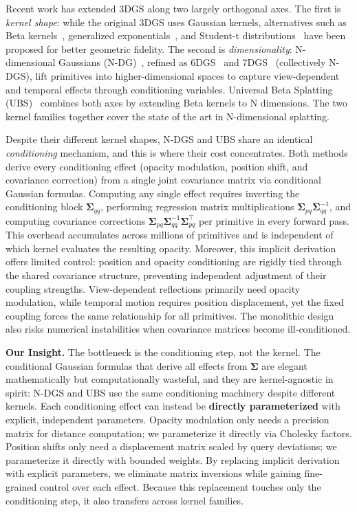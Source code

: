 \documentclass{article}
\theoremstyle{plain}
\theoremstyle{definition}
\theoremstyle{remark}
\begin{document}
Recent work has extended 3DGS along two largely orthogonal axes. The first is \textit{kernel shape}: while the original 3DGS uses Gaussian kernels, alternatives such as Beta kernels~\citep{liu2025deformable,liu2025universal}, generalized exponentials~\citep{hamdi2024gesgeneralizedexponentialsplatting}, and Student-t distributions~\citep{zhu20253dstudentsplattingscooping} have been proposed for better geometric fidelity. The second is \textit{dimensionality}: N-dimensional Gaussians (N-DG)~\citep{diolatzis2024n}, refined as 6DGS~\citep{gao20246dgs} and 7DGS~\citep{gao20257dgs} (collectively N-DGS), lift primitives into higher-dimensional spaces to capture view-dependent and temporal effects through conditioning variables. Universal Beta Splatting (UBS)~\citep{liu2025universal} combines both axes by extending Beta kernels to N dimensions. The two kernel families together cover the state of the art in N-dimensional splatting.

Despite their different kernel shapes, N-DGS and UBS share an identical \textit{conditioning} mechanism, and this is where their cost concentrates. Both methods derive every conditioning effect (opacity modulation, position shift, and covariance correction) from a single joint covariance matrix via conditional Gaussian formulas. Computing any single effect requires inverting the conditioning block $\boldsymbol{\Sigma}_{qq}$, performing regression matrix multiplications $\boldsymbol{\Sigma}_{pq}\boldsymbol{\Sigma}_{qq}^{-1}$, and computing covariance corrections $\boldsymbol{\Sigma}_{pq}\boldsymbol{\Sigma}_{qq}^{-1}\boldsymbol{\Sigma}_{pq}^\top$ per primitive in every forward pass. This overhead accumulates across millions of primitives and is independent of which kernel evaluates the resulting opacity. Moreover, this implicit derivation offers limited control: position and opacity conditioning are rigidly tied through the shared covariance structure, preventing independent adjustment of their coupling strengths. View-dependent reflections primarily need opacity modulation, while temporal motion requires position displacement, yet the fixed coupling forces the same relationship for all primitives. The monolithic design also risks numerical instabilities when covariance matrices become ill-conditioned.

\textbf{Our Insight.} The bottleneck is the conditioning step, not the kernel. The conditional Gaussian formulas that derive all effects from $\boldsymbol{\Sigma}$ are elegant mathematically but computationally wasteful, and they are kernel-agnostic in spirit: N-DGS and UBS use the same conditioning machinery despite different kernels. Each conditioning effect can instead be \textbf{directly parameterized} with explicit, independent parameters. Opacity modulation only needs a precision matrix for distance computation; we parameterize it directly via Cholesky factors. Position shifts only need a displacement matrix scaled by query deviations; we parameterize it directly with bounded weights. By replacing implicit derivation with explicit parameters, we eliminate matrix inversions while gaining fine-grained control over each effect. Because this replacement touches only the conditioning step, it also transfers across kernel families.
\end{document}
